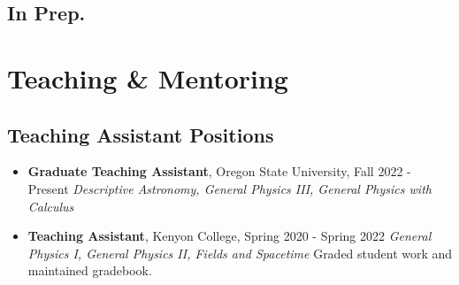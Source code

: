 \documentclass[11pt,letterpaper,sans,unicode]{moderncv}
\newcommand{\blucirc}{{\color{color1} $\circ\;\;$}}
\begin{document}
{\begin{etaremune}[leftmargin=8mm]

\end{etaremune}

\subsection{In Prep.}

\begin{etaremune}[leftmargin=8mm]

\end{etaremune}


%


%

\section{Teaching \& Mentoring}

\subsection{Teaching Assistant Positions}
	\renewcommand\labelitemi{\blucirc}
	\begin{itemize}[leftmargin=8mm]
	\setlength\itemsep{1mm}
	\item \textbf{\color{color1} Graduate Teaching Assistant}, Oregon State University, \hfill Fall 2022 - Present
        		\newline  \textit{Descriptive Astronomy, General Physics III, General Physics with Calculus }
	\item \textbf{\color{color1} Teaching Assistant}, Kenyon College, \hfill Spring 2020 - Spring 2022
        		\newline  \textit{General Physics I, General Physics II, Fields and Spacetime}
			\newline Graded student work and maintained gradebook.
	\end{itemize}

}
\end{document}
